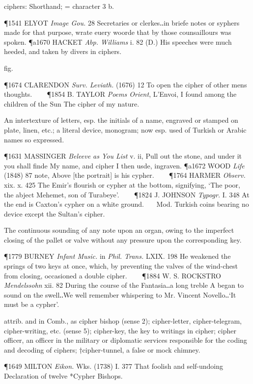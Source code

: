 \begin{description}[wide, labelwidth=!, labelindent=0pt]
\begin{myenumerate}
 ciphers: Shorthand; = character 3 b.

\P 1541 ELYOT  \textit{Image Gou.} 28 Secretaries or clerkes‥in briefe notes or syphers made for that purpose, wrate euery woorde that by those counsaillours was spoken.
\P a1670 HACKET  \textit{Abp. Williams} i. 82 (D.) His speeches were much heeded, and taken by divers in ciphers.

 fig.

\P 1674 CLARENDON  \textit{Surv. Leviath.} (1676) 12 To open the cipher of other mens thoughts.    
\P 1854 B. TAYLOR  \textit{Poems Orient}, L'Envoi, I found among the children of the Sun The cipher of my nature.

 An intertexture of letters, esp. the initials of a name, engraved or stamped on plate, linen, etc.; a literal device, monogram; now esp. used of Turkish or Arabic names so expressed.

\P 1631 MASSINGER  \textit{Beleeve as You List} v. ii, Pull out the stone, and under it you shall finde My name, and cipher I then usde, ingraven.
\P a1672 WOOD  \textit{Life} (1848) 87 note, Above [the portrait] is his cypher.    
\P 1764 HARMER  \textit{Observ.} xix. x. 425 The Emir's flourish or cypher at the bottom, signifying, ‘The poor, the abject Mehemet, son of Turabeye’.    
\P 1824 J. JOHNSON  \textit{Typogr.} I. 348 At the end is Caxton's cypher on a white ground.    Mod. Turkish coins bearing no device except the Sultan's cipher.

 The continuous sounding of any note upon an organ, owing to the imperfect closing of the pallet or valve without any pressure upon the corresponding key.

\P 1779 BURNEY  \textit{Infant Music.} in \textit{Phil. Trans.} LXIX. 198 He weakened the springs of two keys at once, which, by preventing the valves of the wind-chest from closing, occasioned a double cipher.    
\P 1884 W. S. ROCKSTRO  \textit{Mendelssohn} xii. 82 During the course of the Fantasia‥a long treble A began to sound on the swell‥We well remember whispering to Mr. Vincent Novello‥‘It must be a cypher’.

 attrib. and in Comb., as cipher bishop (sense 2); cipher-letter, cipher-telegram, cipher-writing, etc. (sense 5); cipher-key, the key to writings in cipher; cipher officer, an officer in the military or diplomatic services responsible for the coding and decoding of ciphers; †cipher-tunnel, a false or mock chimney.

\P 1649 MILTON  \textit{Eikon.} Wks. (1738) I. 377 That foolish and self-undoing Declaration of twelve *Cypher Bishops.


\end{myenumerate}
\end{description}
